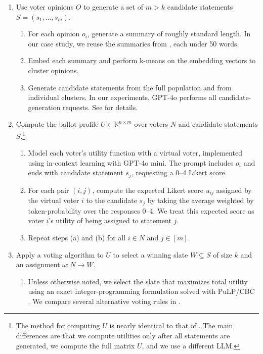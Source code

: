 \documentclass[11pt]{article}
\begin{document}
\begin{enumerate}
    \item Use voter opinions \(O\) to generate a set of \(m > k\) candidate statements \(S=(s_1,\ldots,s_m)\).
    \begin{enumerate}
        \item For each opinion \(o_i\), generate a summary of roughly standard length. In our case study, we reuse the summaries from \citet{fish-v2}, each under 50 words.
        \item Embed each summary %
        and perform k-means on the embedding vectors to cluster opinions.
        \item Generate candidate statements from the full population and from individual clusters. In our experiments, GPT-4o performs all candidate-generation requests. See  for details.
    \end{enumerate}

    \item Compute the ballot profile \(U\in \mathbb{R}^{n\times m}\) over voters \(N\) and candidate statements \(S\).\footnote{The method for computing \(U\) is nearly identical to that of \citet{fish-v2}. The main differences are that we compute utilities only after all statements are generated, we compute the full matrix \(U\), and we use a different LLM.}
    \begin{enumerate}
        \item Model each voter's utility function with a virtual voter, implemented using in-context learning \citep{xie-in-context-learning-2021} with GPT-4o mini. The prompt includes \(o_i\) and ends with candidate statement \(s_j\), requesting a 0--4 Likert score.
        \item For each pair \((i,j)\), compute the expected Likert score \(u_{ij}\) assigned by the virtual voter \(i\) to the candidate \(s_j\) by taking the average weighted by token-probability over the responses 0--4. We treat this expected score as voter \(i\)'s utility of being assigned to statement \(j\).
        \item Repeat steps (a) and (b) for all \(i\in N\) and \(j\in[m]\).
    \end{enumerate}

    \item Apply a voting algorithm to \(U\) to select a winning slate \(W\subseteq S\) of size \(k\) and an assignment \(\omega:N\to W\).
    \begin{enumerate}
        \item Unless otherwise noted, we select the slate that maximizes total utility using an exact integer-programming formulation solved with PuLP/CBC \citep{pulp, john_forrest_cbc}. We compare several alternative voting rules in .
    \end{enumerate}
\end{enumerate}
\end{document}

